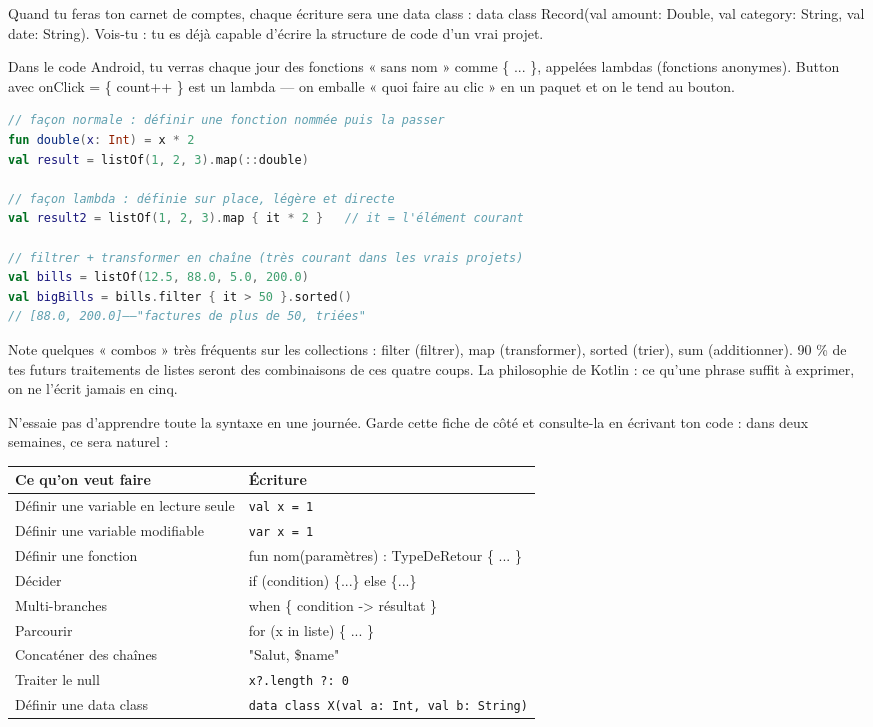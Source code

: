 Quand tu feras ton carnet de comptes, chaque écriture sera une data class : data class Record(val amount: Double, val category: String, val date: String). Vois-tu : tu es déjà capable d'écrire la structure de code d'un vrai projet.


Dans le code Android, tu verras chaque jour des fonctions « sans nom » comme \{ ... \}, appelées lambdas (fonctions anonymes). Button avec onClick = \{ count++ \} est un lambda — on emballe « quoi faire au clic » en un paquet et on le tend au bouton.

\begin{lstlisting}[language=Kotlin]
// façon normale : définir une fonction nommée puis la passer
fun double(x: Int) = x * 2
val result = listOf(1, 2, 3).map(::double)

// façon lambda : définie sur place, légère et directe
val result2 = listOf(1, 2, 3).map { it * 2 }   // it = l'élément courant

// filtrer + transformer en chaîne (très courant dans les vrais projets)
val bills = listOf(12.5, 88.0, 5.0, 200.0)
val bigBills = bills.filter { it > 50 }.sorted()
// [88.0, 200.0]——"factures de plus de 50, triées"
\end{lstlisting}

Note quelques « combos » très fréquents sur les collections : filter (filtrer), map (transformer), sorted (trier), sum (additionner). 90 \% de tes futurs traitements de listes seront des combinaisons de ces quatre coups. La philosophie de Kotlin : ce qu'une phrase suffit à exprimer, on ne l'écrit jamais en cinq.


N'essaie pas d'apprendre toute la syntaxe en une journée. Garde cette fiche de côté et consulte-la en écrivant ton code : dans deux semaines, ce sera naturel :

\begin{center}
\begin{tabularx}{\linewidth}{|X|X|}
\hline
\textbf{Ce qu'on veut faire} & \textbf{Écriture} \tabularnewline
\hline
Définir une variable en lecture seule & \texttt{val x = 1} \tabularnewline
Définir une variable modifiable & \texttt{var x = 1} \tabularnewline
Définir une fonction & fun nom(paramètres) : TypeDeRetour \{ ... \} \tabularnewline
Décider & if (condition) \{...\} else \{...\} \tabularnewline
Multi-branches & when \{ condition -> résultat \} \tabularnewline
Parcourir & for (x in liste) \{ ... \} \tabularnewline
Concaténer des chaînes & "Salut, \$name" \tabularnewline
Traiter le null & \texttt{x?.\allowbreak length ?: 0} \tabularnewline
Définir une data class & \texttt{data class X(val a: Int, val b: String)} \tabularnewline
\hline
\end{tabularx}
\end{center}

